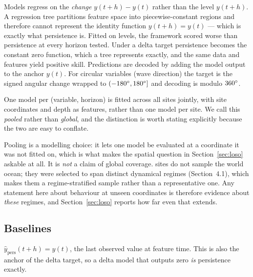 Models regress on the \emph{change} $y(t+h) - y(t)$ rather than the level
$y(t+h)$. A regression tree partitions feature space into piecewise-constant
regions and therefore cannot represent the identity function
$y(t+h) = y(t)$ --- which is exactly what persistence is. Fitted on levels, the
framework scored worse than persistence at every horizon tested. Under a delta
target persistence becomes the constant zero function, which a tree represents
exactly, and the same data and features yield positive skill. Predictions are
decoded by adding the model output to the anchor $y(t)$. For circular
variables (wave direction) the target is the signed angular change wrapped to
$(-180^{\circ}, 180^{\circ}]$ and decoding is modulo $360^{\circ}$.

One model per (variable, horizon) is fitted across all \NSites{} sites jointly,
with site coordinates and depth as features, rather than one model per site.
We call this \emph{pooled} rather than \emph{global}, and the distinction is
worth stating explicitly because the two are easy to conflate.

Pooling is a modelling choice: it lets one model be evaluated at a coordinate
it was not fitted on, which is what makes the spatial question in
Section~\ref{sec:loso} askable at all. It is \emph{not} a claim of global
coverage. \NSites{} sites do not sample the world ocean; they were selected to
span distinct dynamical regimes (Section~4.1), which makes them a
regime-stratified sample rather than a representative one. Any statement here
about behaviour at unseen coordinates is therefore evidence about \emph{these}
regimes, and Section~\ref{sec:loso} reports how far even that extends.

\subsection{Baselines}

$\hat{y}_{\text{pers}}(t+h) = y(t)$, the last observed value at feature time.
This is also the anchor of the delta target, so a delta model that outputs
zero \emph{is} persistence exactly.


